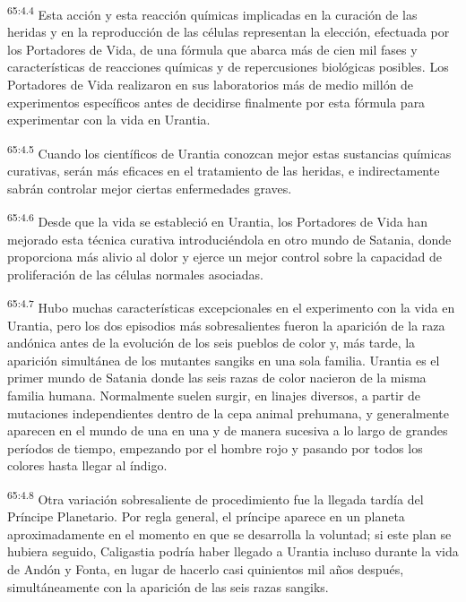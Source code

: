 \par
\textsuperscript{65:4.4} Esta acción y esta reacción químicas implicadas en la curación de las heridas y en la reproducción de las células representan la elección, efectuada por los Portadores de Vida, de una fórmula que abarca más de cien mil fases y características de reacciones químicas y de repercusiones biológicas posibles. Los Portadores de Vida realizaron en sus laboratorios más de medio millón de experimentos específicos antes de decidirse finalmente por esta fórmula para experimentar con la vida en Urantia.

\par
\textsuperscript{65:4.5} Cuando los científicos de Urantia conozcan mejor estas sustancias químicas curativas, serán más eficaces en el tratamiento de las heridas, e indirectamente sabrán controlar mejor ciertas enfermedades graves.

\par
\textsuperscript{65:4.6} Desde que la vida se estableció en Urantia, los Portadores de Vida han mejorado esta técnica curativa introduciéndola en otro mundo de Satania, donde proporciona más alivio al dolor y ejerce un mejor control sobre la capacidad de proliferación de las células normales asociadas.

\par
\textsuperscript{65:4.7} Hubo muchas características excepcionales en el experimento con la vida en Urantia, pero los dos episodios más sobresalientes fueron la aparición de la raza andónica antes de la evolución de los seis pueblos de color y, más tarde, la aparición simultánea de los mutantes sangiks en una sola familia. Urantia es el primer mundo de Satania donde las seis razas de color nacieron de la misma familia humana. Normalmente suelen surgir, en linajes diversos, a partir de mutaciones independientes dentro de la cepa animal prehumana, y generalmente aparecen en el mundo de una en una y de manera sucesiva a lo largo de grandes períodos de tiempo, empezando por el hombre rojo y pasando por todos los colores hasta llegar al índigo.

\par
\textsuperscript{65:4.8} Otra variación sobresaliente de procedimiento fue la llegada tardía del Príncipe Planetario. Por regla general, el príncipe aparece en un planeta aproximadamente en el momento en que se desarrolla la voluntad; si este plan se hubiera seguido, Caligastia podría haber llegado a Urantia incluso durante la vida de Andón y Fonta, en lugar de hacerlo casi quinientos mil años después, simultáneamente con la aparición de las seis razas sangiks.

